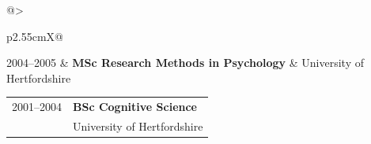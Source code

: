 \documentclass[
  a4paper,
]{article}
\begin{document}
\noindent

\begin{tabularx}{\linewidth}{@{}>{\small\raggedright\arraybackslash{}\leavevmode\color{muted}}p{2.55cm}X@{}}
2004--2005 & \textbf{MSc Research Methods in Psychology}\tabularnewline
& {\small University of Hertfordshire}\tabularnewline
\end{tabularx}\par\vspace{4pt}

\noindent

\begin{tabularx}{\linewidth}{@{}>{\small\raggedright\arraybackslash\hyphenpenalty=10000\leavevmode\color{muted}}p{2.55cm}X@{}}
2001--2004 & \textbf{BSc Cognitive Science}\tabularnewline
& {\small University of Hertfordshire}\tabularnewline
\end{tabularx}\par\vspace{4pt}
\end{document}
